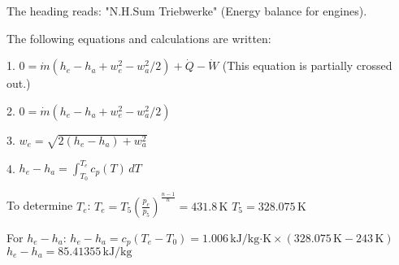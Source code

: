 The heading reads: "N.H.Sum Triebwerke" (Energy balance for engines).  

The following equations and calculations are written:  

1. \( 0 = \dot{m} (h_e - h_a + w_e^2 - w_a^2 / 2) + \dot{Q} - \dot{W} \)  
   (This equation is partially crossed out.)  

2. \( 0 = \dot{m} (h_e - h_a + w_e^2 - w_a^2 / 2) \)  

3. \( w_e = \sqrt{2 (h_e - h_a) + w_a^2} \)  

4. \( h_e - h_a = \int_{T_0}^{T_e} c_p(T) \, dT \)  

To determine \( T_e \):  
\( T_e = T_5 \left( \frac{p_e}{p_5} \right)^{\frac{n-1}{n}} = 431.8 \, \text{K} \)  
\( T_5 = 328.075 \, \text{K} \)  

For \( h_e - h_a \):  
\( h_e - h_a = c_p (T_e - T_0) = 1.006 \, \text{kJ/kg·K} \times (328.075 \, \text{K} - 243 \, \text{K}) \)  
\( h_e - h_a = 85.41355 \, \text{kJ/kg} \)